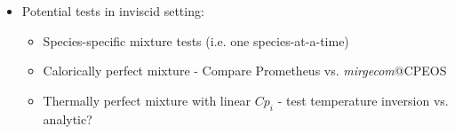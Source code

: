 \begin{frame}
\begin{multicols}{2}
\begin{itemize}
   \item Potential tests in inviscid setting:
   \begin{itemize}
     \item Species-specific mixture tests (i.e. one species-at-a-time)
     \item Calorically perfect mixture - Compare Prometheus vs. \textit{mirgecom}@CPEOS
     \item Thermally perfect mixture with linear $Cp_i$ - test temperature inversion vs. analytic? 
   \end{itemize}
\end{itemize}
\end{multicols}
\end{frame}


